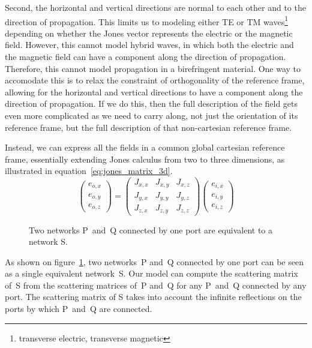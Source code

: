 \documentclass[a4paper,11pt]{article}
\begin{document}
Second, the horizontal and vertical directions are normal to each other and to the direction of propagation.
This limits us to modeling either TE or TM waves\footnote{transverse electric, transverse magnetic} depending on whether the Jones vector represents the electric or the magnetic field.
However, this cannot model hybrid waves, in which both the electric and the magnetic field can have a component along the direction of propagation.
Therefore, this cannot model propagation in a birefringent material.
One way to accomodate this is to relax the constraint of orthogonality of the reference frame, allowing for the horizontal and vertical directions to have a component along the direction of propagation.
If we do this, then the full description of the field gets even more complicated as we need to carry along, not just the orientation of its reference frame, but the full description of that non-cartesian reference frame.

Instead, we can express all the fields in a common global cartesian reference frame, essentially extending Jones calculus from two to three dimensions, as illustrated in equation~\eqref{eq:jones_matrix_3d}.
\begin{equation}
    \begin{pmatrix}
        e_{o, x}\\
        e_{o, y}\\
        e_{o, z}
    \end{pmatrix}
    =
    \begin{pmatrix}
        J_{x, x}   &   J_{x, y}   &   J_{x, z} \\
        J_{y, x}   &   J_{y, y}   &   J_{y, z} \\
        J_{z, x}   &   J_{z, y}   &   J_{z, z}
    \end{pmatrix}
    \begin{pmatrix}
        e_{i, x}\\
        e_{i, y}\\
        e_{i, z}
    \end{pmatrix}
    \label{eq:jones_matrix_3d}
\end{equation}

\begin{figure}[hbtp]
    \centering
    
    \caption{\label{fig:cascading}Two networks P~and~Q connected by one port are equivalent to a network S.}
\end{figure}
As shown on figure~\ref{fig:cascading}, two networks~P and~Q connected by one port can be seen as a single equivalent network~S.
Our model can compute the scattering matrix of~S from the scattering matrices of~P and~Q for any P~and~Q connected by any port.
The scattering matrix of S takes into account the infinite reflections on the ports by which P~and~Q are connected.
\end{document}
